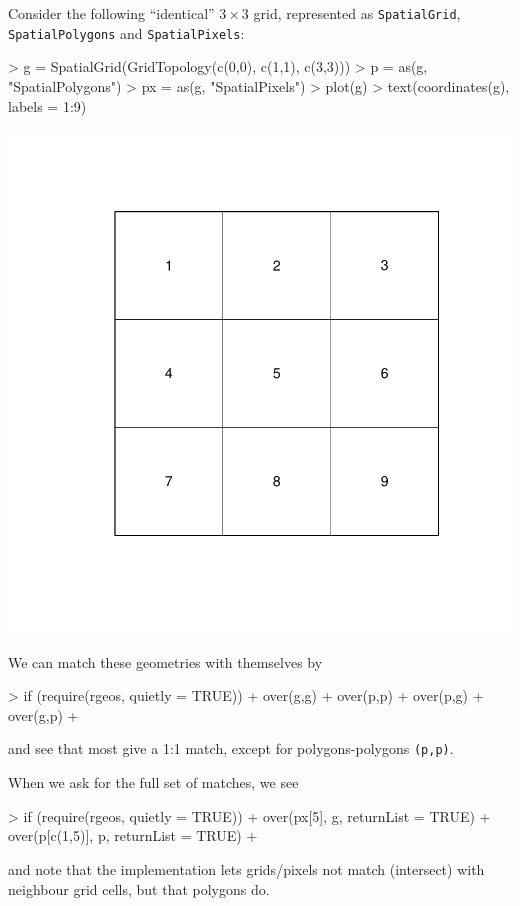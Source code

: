 \documentclass{article}
\newcommand{\code}[1]{{\tt #1}}
\begin{document}
Consider the following ``identical'' $3 \times 3$ grid, represented as 
\code{SpatialGrid}, \code{SpatialPolygons} and \code{SpatialPixels}:
\begin{Schunk}
\begin{Sinput}
> g = SpatialGrid(GridTopology(c(0,0), c(1,1), c(3,3)))
> p = as(g, "SpatialPolygons")
> px = as(g, "SpatialPixels")
> plot(g)
> text(coordinates(g), labels = 1:9)
\end{Sinput}
\end{Schunk}
\includegraphics{over-020}

We can match these geometries with themselves by
\begin{Schunk}
\begin{Sinput}
> if (require(rgeos, quietly = TRUE)) {
+ over(g,g)
+ over(p,p)
+ over(p,g)
+ over(g,p)
+ }
\end{Sinput}
\end{Schunk}
and see that most give a 1:1 match, except for polygons-polygons \code{(p,p)}.

When we ask for the full set of matches, we see
\begin{Schunk}
\begin{Sinput}
> if (require(rgeos, quietly = TRUE)) {
+ over(px[5], g, returnList = TRUE)
+ over(p[c(1,5)], p, returnList = TRUE)
+ }
\end{Sinput}
\end{Schunk}
and note that the implementation lets grids/pixels not match
(intersect) with neighbour grid cells, but that polygons do. 
\end{document}
